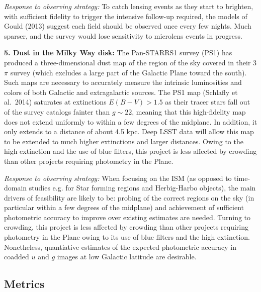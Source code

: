{\it Response to observing strategy:} To catch lensing events as they
start to brighten, with sufficient fidelity to trigger the intensive
follow-up required, the models of Gould (2013) suggest each field
should be observed once every few nights. Much sparser, and the survey
would lose sensitivity to microlens events in progress.

{\bf 5. Dust in the Milky Way disk:} The Pan-STARRS1 survey (PS1) has
produced a three-dimensional dust map of the region of the sky covered
in their 3$\pi$ survey (which excludes a large part of the Galactic
Plane toward the south). Such maps are necessary to accurately measure
the intrinsic luminosities and colors of both Galactic and
extragalactic sources. The PS1 map (Schlafly et al.~2014) saturates at
extinctions $E(B-V) > 1.5$ as their tracer stars fall out of the
survey catalogs fainter than $g\sim 22$, meaning that this
high-fidelity map does not extend uniformly to within a few degrees of
the midplane. In addition, it only extends to a distance of about 4.5
kpc. Deep LSST data will allow this map to be extended to much higher
extinctions and larger distances. Owing to the high extinction and the
use of blue filters, this project is less affected by crowding than
other projects requiring photometry in the Plane. 

{\it Response to observing strategy:} When focusing on the ISM (as
opposed to time-domain studies e.g. for Star forming regions and
Herbig-Harbo objects), the main drivers of feasibility are likely to
be: probing of the correct regions on the sky (in particular within a
few degrees of the midplane) and achievement of sufficient photometric
accuracy to improve over existing estimates are needed. Turning to
crowding, this project is less affected by crowding than other
projects requiring photometry in the Plane owing to its use of blue
filters and the high extinction. Nonetheless, quantiative estimates of
the expected photometric accuracy in coadded $u$ and $g$ images at low
Galactic latitude are desirable.



\subsection{Metrics}
\label{sec:keyword:MW_Disk_metrics}


